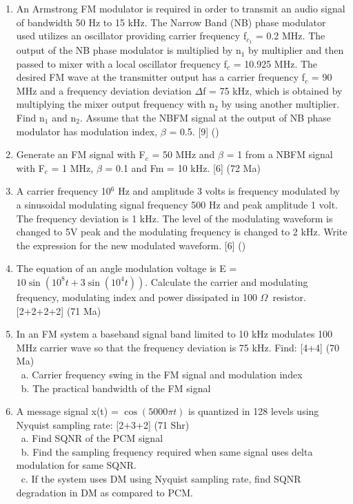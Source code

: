 \documentclass[12pt]{article}
\newcommand{\W}{\(\Omega\)}
\newcommand{\enter}{\\\textcolor{white}{1}}
\begin{document}
\begin{enumerate}
      \item An Armstrong FM modulator is required in order to transmit an audio signal of bandwidth 50 Hz to 15 kHz. The Narrow Band (NB) phase modulator used utilizes an oscillator providing carrier frequency f$_{c_{1}}$ = 0.2 MHz. The output of the NB phase modulator is multiplied by n$_1$ by multiplier and then passed to mixer with a local oscillator frequency f$_c$ = 10.925 MHz. The desired FM wave at the transmitter output has a carrier frequency f$_c$ = 90 MHz and a frequency deviation deviation $\Delta$f = 75 kHz, which is obtained by multiplying the mixer output frequency with n$_2$ by using another multiplier. Find n$_1$ and n$_2$. Assume that the NBFM signal at the output of NB phase modulator has modulation index, $\beta$ = 0.5. \hfill [9] ()

      \item Generate an FM signal with F$_c$ = 50 MHz and $\beta$ = 1 from a NBFM signal with F$_c$ = 1 MHz, $\beta$ = 0.1 and Fm = 10 kHz. \hfill [6] (72 Ma)

      \item A carrier frequency 10$^6$ Hz and amplitude 3 volts is frequency modulated by a sinusoidal modulating signal frequency 500 Hz and peak amplitude 1 volt. The frequency deviation is 1 kHz. The level of the modulating waveform is changed to 5V peak and the modulating frequency is changed to 2 kHz. Write the expression for the new modulated waveform. \hfill [6] ()

      \item The equation of an angle modulation voltage is E = $10 \sin(10^8t + 3 \sin(10^4t))$. Calculate the carrier and modulating frequency, modulating index and power dissipated in 100 \W\ resistor. \hfill [2+2+2+2] (71 Ma)

      \item In an FM system a baseband signal band limited to 10 kHz modulates 100 MHz carrier wave so that the frequency deviation is 75 kHz. Find: \hfill [4+4] (70 Ma)
      \enter a. Carrier frequency swing in the FM signal and modulation index
      \enter b. The practical bandwidth of the FM signal
      
      \item A message signal x(t) = $\cos(5000\pi t)$ is quantized in 128 levels using Nyquist sampling rate: \hfill [2+3+2] (71 Shr)
      \enter a. Find SQNR of the PCM signal
      \enter b. Find the sampling frequency required when same signal uses delta modulation for same SQNR.
      \enter c. If the system uses DM using Nyquist sampling rate, find SQNR degradation in DM as compared to PCM.
    \end{enumerate}
\end{document}
